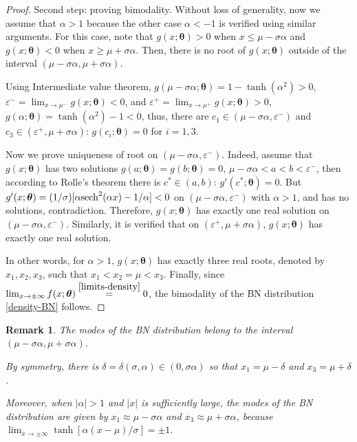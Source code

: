 \documentclass[12pt]{article}
\newtheorem{remark}[theorem]{Remark}
\theoremstyle{definition}
\begin{document}
\begin{proof}

\smallskip
{\sc Second step: proving bimodality.}
Without loss of generality, now we assume that $\alpha>1$ because the other case  $\alpha<-1$ is verified using similar arguments. For this case, note that $g(x;\boldsymbol{\theta})>0$ when $x\leq \mu-\sigma\alpha$ and $g(x;\boldsymbol{\theta})<0$ when $x\geq \mu+\sigma\alpha$. Then, there is no root of $g(x;\boldsymbol{\theta})$ outside of the interval $(\mu-\sigma\alpha,\mu+\sigma\alpha)$.

Using Intermediate value theorem, $g(\mu-\sigma\alpha;\boldsymbol{\theta})=1-\tanh(\alpha^2)>0$, $\varepsilon^-=\lim_{x\to \mu^-}g(x;\boldsymbol{\theta})<0$, 
and
$\varepsilon^+=\lim_{x\to \mu^+}g(x;\boldsymbol{\theta})>0$, $g(\alpha;\boldsymbol{\theta})=\tanh(\alpha^2)-1<0$, thus, there are $c_1\in (\mu-\sigma\alpha,\varepsilon^-)$ and $c_3\in (\varepsilon^+,\mu+\sigma\alpha)$: $g(c_i;\boldsymbol{\theta})=0$ for $i=1,3$.

Now we prove uniqueness of root on  $(\mu-\sigma\alpha,\varepsilon^-)$. Indeed,
assume  that $g(x;\boldsymbol{\theta})$ has two solutions $g(a;\boldsymbol{\theta})=g(b;\boldsymbol{\theta})=0$, $\mu-\sigma\alpha<a<b<\varepsilon^-$, then according to Rolle's theorem there is $c^*\in(a,b)$: $g'(c^*;\boldsymbol{\theta})=0$. But $g'(x;\boldsymbol{\theta})=(1/\sigma)[\alpha{\rm sech}^2(\alpha x)-{1/\alpha}]<0$ on $(\mu-\sigma\alpha,\varepsilon^-)$ with $\alpha>1$, and has no solutions, contradiction. Therefore, $g(x;\boldsymbol{\theta})$ has exactly one real solution on $(\mu-\sigma\alpha,\varepsilon^-)$. Similarly, it is verified that on $(\varepsilon^+,\mu+\sigma\alpha)$,  $g(x;\boldsymbol{\theta})$ has exactly one real solution.

In other words, for $\alpha>1$, $g(x;\boldsymbol{\theta})$ has exactly three real roots, denoted by $x_1,x_2, x_3$,  such that $x_1<x_2=\mu<x_3$. Finally, since $\lim_{x\to \pm\infty} f(x;\boldsymbol{\theta})\stackrel{\eqref{limits-density}}{=}0$, the  bimodality of the BN distribution \eqref{density-BN} follows.
\end{proof}

\begin{remark}
The modes of the BN distribution belong to the interval $(\mu-\sigma\alpha,\mu+\sigma\alpha)$.

By symmetry, there is $\delta=\delta(\sigma,\alpha)\in(0,\sigma\alpha)$ so that $x_1=\mu-\delta$ and $x_3=\mu+\delta$.
	
Moreover, when $\vert\alpha\vert>1$ and $\vert x\vert$ is sufficiently large, the modes of the BN distribution  are given by $x_1\approx \mu-\sigma\alpha$ and $x_3\approx \mu+\sigma\alpha$, because $\lim_{x\to\pm\infty}\tanh[\alpha (x-\mu)/\sigma]=\pm 1$.
\end{remark}
\end{document}
